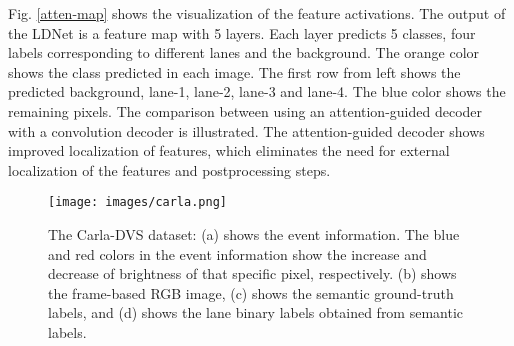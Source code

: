 \documentclass[journal]{IEEEtran}
\begin{document}
\begin{table}[t]
\centering
\caption{Quantitative analysis of LDNet with different backbone networks. The experimental analysis is performed on both the multiclass and binary-class tasks and the results are evaluated in terms of the mean $F1$ and $IoU$ scores.}
\label{table 3}
\end{table}
Fig. \ref{atten-map} shows the visualization of the feature activations. The output of the LDNet is a feature map with 5 layers. Each layer predicts 5 classes, four labels corresponding to different lanes and the background. The orange color shows the class predicted in each image. The first row from left shows the predicted background, lane-1, lane-2, lane-3 and lane-4. The blue color shows the remaining pixels.  
The comparison between using an attention-guided decoder with a convolution decoder is illustrated. The attention-guided decoder shows improved localization of features, which eliminates the need for external localization of the features and postprocessing steps.

\begin{figure}[t]
      \centering
      \texttt{[image: images/carla.png]}
\caption{The Carla-DVS dataset: (a) shows the event information. The blue and red colors in the event information show the increase and decrease of brightness of that specific pixel, respectively. (b) shows the frame-based RGB image, (c) shows the semantic ground-truth labels, and (d) shows the lane binary labels obtained from semantic labels.  } 
      \label{carla}
\end{figure}
\end{document}
